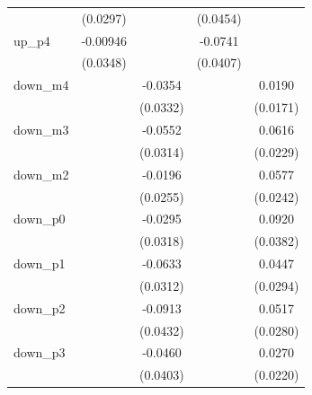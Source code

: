 \begin{table}[htbp]
\begin{tabular}{l*{4}{c}}
                    &    (0.0297)         &                     &    (0.0454)         &                     \\
[1em]
up\_p4               &    -0.00946         &                     &     -0.0741\sym{*}  &                     \\
                    &    (0.0348)         &                     &    (0.0407)         &                     \\
[1em]
down\_m4             &                     &     -0.0354         &                     &      0.0190         \\
                    &                     &    (0.0332)         &                     &    (0.0171)         \\
[1em]
down\_m3             &                     &     -0.0552\sym{*}  &                     &      0.0616\sym{***}\\
                    &                     &    (0.0314)         &                     &    (0.0229)         \\
[1em]
down\_m2             &                     &     -0.0196         &                     &      0.0577\sym{**} \\
                    &                     &    (0.0255)         &                     &    (0.0242)         \\
[1em]
down\_p0             &                     &     -0.0295         &                     &      0.0920\sym{**} \\
                    &                     &    (0.0318)         &                     &    (0.0382)         \\
[1em]
down\_p1             &                     &     -0.0633\sym{**} &                     &      0.0447         \\
                    &                     &    (0.0312)         &                     &    (0.0294)         \\
[1em]
down\_p2             &                     &     -0.0913\sym{**} &                     &      0.0517\sym{*}  \\
                    &                     &    (0.0432)         &                     &    (0.0280)         \\
[1em]
down\_p3             &                     &     -0.0460         &                     &      0.0270         \\
                    &                     &    (0.0403)         &                     &    (0.0220)         \\

\end{tabular}
\end{table}
